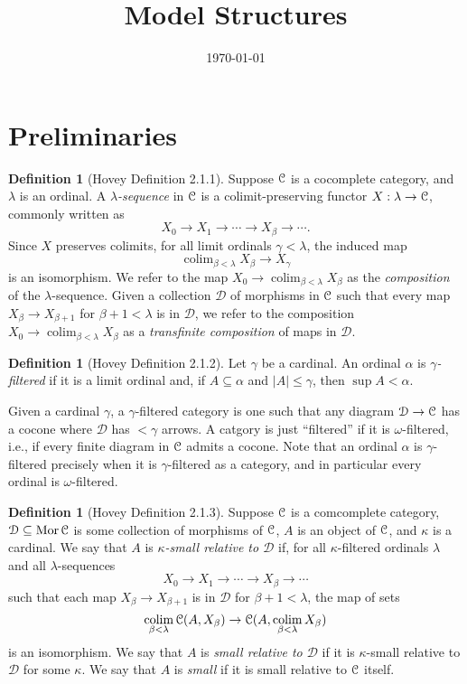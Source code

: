 \documentclass{amsart}
\title{Model Structures}
\author{}
\date{\today}
\theoremstyle{plain}
\theoremstyle{definition}
\newtheorem{definition}[theorem]{Definition}
\newcommand{\sseq}{\subseteq}
\newcommand{\0}{\mathbf{0}}
\newcommand{\cC}{\mathcal C}
\newcommand{\cD}{\mathcal D}
\renewcommand{\(}{\left(}
\renewcommand{\)}{\right)}
\def\scr{\EuScript}
\def\cC{\scr{C}}
\DeclareMathOperator*{\colim}{colim}
\DeclareMathOperator{\Mor}{Mor}
\begin{document}
\maketitle


\tableofcontents

\section{Preliminaries}

\begin{definition}[Hovey Definition 2.1.1]
  Suppose $\cC$ is a cocomplete category, and $\lambda$ is an ordinal. A \textit{$\lambda$-sequence} in $\cC$ is a colimit-preserving functor $X:\lambda\to\cC$, commonly written as
  \[X_0\to X_1\to\cdots\to X_\beta\to\cdots.\]
  Since $X$ preserves colimits, for all limit ordinals $\gamma<\lambda$, the induced map
  \[\colim_{\beta<\lambda}X_\beta\to X_\gamma\]
  is an isomorphism. We refer to the map $X_0\to \colim_{\beta<\lambda}X_\beta$ as the \textit{composition} of the $\lambda$-sequence. Given a collection $\cD$ of morphisms in $\cC$ such that every map $X_\beta\to X_{\beta+1}$ for $\beta+1<\lambda$ is in $\cD$, we refer to the composition $X_0\to\colim_{\beta<\lambda}X_\beta$ as a \textit{transfinite composition} of maps in $\cD$.
\end{definition}

\begin{definition}[Hovey Definition 2.1.2]
  Let $\gamma$ be a cardinal. An ordinal $\alpha$ is \textit{$\gamma$-filtered} if it is a limit ordinal and, if $A\sseq\alpha$ and $|A|\leq\gamma$, then $\sup A<\alpha$.
\end{definition}

Given a cardinal $\gamma$, a $\gamma$-filtered category is one such that any diagram $\cD\to\cC$ has a cocone where $\cD$ has $<\gamma$ arrows. A catgory is just ``filtered'' if it is $\omega$-filtered, i.e., if every finite diagram in $\cC$ admits a cocone. Note that an ordinal $\alpha$ is $\gamma$-filtered precisely when it is $\gamma$-filtered as a category, and in particular every ordinal is $\omega$-filtered.

\begin{definition}[Hovey Definition 2.1.3]
  Suppose $\cC$ is a comcomplete category, $\cD\sseq\Mor\cC$ is some collection of morphisms of $\cC$, $A$ is an object of $\cC$, and $\kappa$ is a cardinal. We say that $A$ is \textit{$\kappa$-small relative to $\cD$} if, for all $\kappa$-filtered ordinals $\lambda$ and all $\lambda$-sequences
  \[X_0\to X_1\to\cdots\to X_\beta\to\cdots\]
  such that each map $X_\beta\to X_{\beta+1}$ is in $\cD$ for $\beta+1<\lambda$, the map of sets
  \[\colim_{\beta<\lambda}\cC(A,X_\beta)\to\cC(A,\colim_{\beta<\lambda}X_\beta)\]
  is an isomorphism. We say that $A$ is \textit{small relative to $\cD$} if it is $\kappa$-small relative to $\cD$ for some $\kappa$. We say that $A$ is \textit{small} if it is small relative to $\cC$ itself.
\end{definition}
\end{document}
